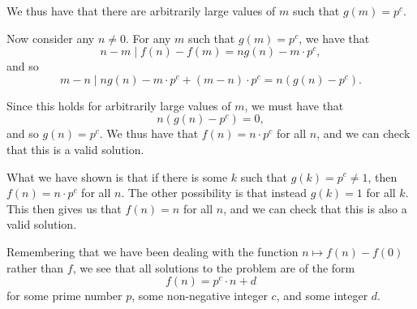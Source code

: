 \documentclass[12pt]{article}
\begin{document}
\begin{enumerate}
We thus have that there are arbitrarily large values of $m$ such that $g(m) =
p^c$.

Now consider any $n \neq 0$. For any $m$ such that $g(m) = p^c$, we have that
\[
    n - m \mid f(n) - f(m) = ng(n) - m\cdot p^c,
\]
and so
\[
    m - n \mid ng(n) - m\cdot p^c + (m - n) \cdot p^c = n(g(n) - p^c).
\]

Since this holds for arbitrarily large values of $m$, we must have that
\[
    n(g(n) - p^c) = 0,
\]
and so $g(n) = p^c$. We thus have that $f(n) = n \cdot p^c$ for all $n$, and we
can check that this is a valid solution.

What we have shown is that if there is some $k$ such that $g(k) = p^c \neq 1$,
then $f(n) = n \cdot p^c$ for all $n$. The other possibility is that instead
$g(k) = 1$ for all $k$. This then gives us that $f(n) = n$ for all $n$, and we
can check that this is also a valid solution.

Remembering that we have been dealing with the function $n \mapsto f(n) - f(0)$
rather than $f$, we see that all solutions to the problem are of the form
\[
    f(n) = p^c \cdot n + d
\]
for some prime number $p$, some non-negative integer $c$, and some integer $d$.

\end{enumerate}
\end{document}
